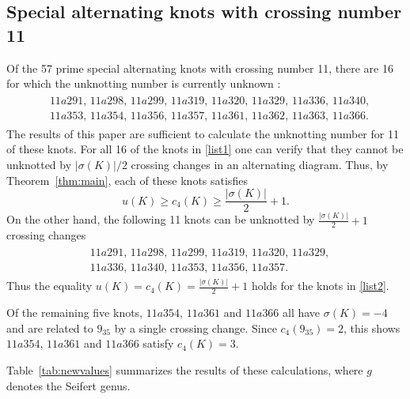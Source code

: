 \documentclass[a4paper,11pt]{amsart}
\theoremstyle{definition}
\theoremstyle{remark}
\numberwithin{equation}{section}
\begin{document}
\subsection{Special alternating knots with crossing number 11}
 Of the 57 prime special alternating knots with crossing number 11, there are 16 for which the unknotting number is currently unknown \cite{knotinfo}:
 \begin{align}\begin{split}\label{list1}
&11a291,\, 11a298,\, 11a299,\, 11a319,\, 11a320,\, 11a329,\, 11a336,\, 11a340,\\
&11a353,\, 11a354,\, 11a356,\, 11a357,\, 11a361,\, 11a362,\, 11a363,\, 11a366.
\end{split}\end{align}
The results of this paper are sufficient to calculate the unknotting number for 11 of these knots. For all 16 of the knots in \eqref{list1} one can verify that they cannot be unknotted by $|\sigma(K)|/2$ crossing changes in an alternating diagram. Thus, by Theorem~\ref{thm:main}, each of these knots satisfies
\[
u(K)\ge c_4(K)\ge \frac{|\sigma(K)|}{2}+1.
\]
 On the other hand, the following 11 knots can be unknotted by $\frac{|\sigma(K)|}{2} +1 $ crossing changes 
 \begin{align}\begin{split}\label{list2}
&11a291,\, 11a298,\, 11a299,\, 11a319,\, 11a320,\, 11a329,\\
&11a336,\, 11a340,\, 11a353,\, 11a356,\, 11a357.
\end{split}\end{align}
 Thus the equality $u(K)=c_4(K)=\frac{|\sigma(K)|}{2}+1$ holds for the knots in \eqref{list2}.


Of the remaining five knots, $11a354$, $11a361$ and $11a366$ all have $\sigma(K)=-4$ and are related to $9_{35}$ by a single crossing change. Since $c_4(9_{35})=2$, this shows $11a354$, $11a361$ and $11a366$ satisfy $c_4(K)=3$. 


Table~\ref{tab:newvalues} summarizes the results of these calculations, where $g$ denotes the Seifert genus.
\end{document}
